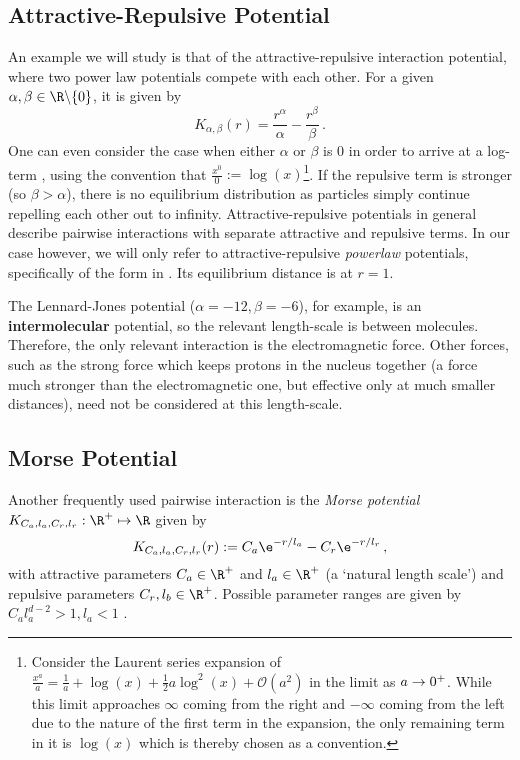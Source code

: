 \subsection{Attractive-Repulsive Potential}
An example we will study is that of the attractive-repulsive interaction potential, where two power law potentials compete with each other.
For a given $\alpha, \beta \in \R \backslash \{0\}$, it is given by
\begin{equation}
  K_{\alpha, \beta}(r) = \frac{r^\alpha}{\alpha} - \frac{r^\beta}{\beta}\,.
  \label{eq:attractive-repulsive-potential}
\end{equation}
One can even consider the case when either $\alpha$ or $\beta$ is 0 in order to arrive at a log-term \parencite{2017-explicit-solutions}, using the convention that $\frac{x^0}{0} := \log(x)$\footnote{
  Consider the Laurent series expansion of $\frac{x^a}{a} = \frac{1}{a} + \log(x) + \frac{1}{2}a \log^2(x) + \mathcal{O}(a^2)$ in the limit as $a \rightarrow 0^+$.
  While this limit approaches $\infty$ coming from the right and $-\infty$ coming from the left due to the nature of the first term in the expansion, the only remaining term in it is $\log(x)$ which is thereby chosen as a convention.
}.
If the repulsive term is stronger (so $\beta > \alpha$), there is no equilibrium distribution as particles simply continue repelling each other out to infinity.
Attractive-repulsive potentials in general describe pairwise interactions with separate attractive and repulsive terms.
In our case however, we will only refer to attractive-repulsive \textit{powerlaw} potentials, specifically of the form in .
Its equilibrium distance is at $r = 1$.

The Lennard-Jones potential ($\alpha=-12, \beta=-6$), for example, is an \textbf{intermolecular} potential, so the relevant length-scale is between molecules.
Therefore, the only relevant interaction is the electromagnetic force.
Other forces, such as the strong force which keeps protons in the nucleus together (a force much stronger than the electromagnetic one, but effective only at much smaller distances), need not be considered at this length-scale.

\subsection{Morse Potential}
Another frequently used pairwise interaction is the \textit{Morse potential} $K_{C_a, l_a, C_r, l_r}: \R^+ \mapsto \R$ given by
\begin{equation}
  K_{C_a, l_a, C_r, l_r}(r) := C_a \e^{-r / l_a} - C_r \e^{-r / l_r}\,,
  \label{eq:morse-potential}
\end{equation}
with attractive parameters $C_a \in \R^+$ and $l_a \in \R^+$ (a `natural length scale') and repulsive parameters $C_r, l_b \in \R^+$.
Possible parameter ranges are given by $C_a l_a^{d-2} > 1, l_a < 1$ \parencite{2006-self-propelled,2014-explicit-flock-solutions-for-quasi-morse-potentials}.


